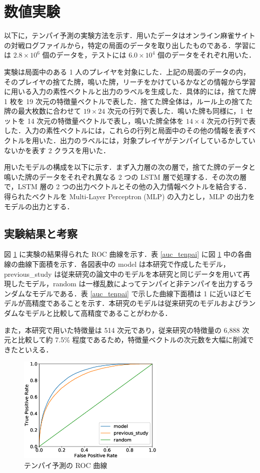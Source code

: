\documentclass[a4paper,twoside,twocolumn,10pt]{article}
\begin{document}
\section{数値実験}
以下に，テンパイ予測の実験方法を示す．用いたデータはオンライン麻雀サイトの対戦ログファイルから，特定の局面のデータを取り出したものである．学習には $2.8\times10^6$ 個のデータを，テストには $6.0\times10^4$ 個のデータをそれぞれ用いた．

実験は局面中のある 1 人のプレイヤを対象にした．上記の局面のデータの内，そのプレイヤの捨てた牌，鳴いた牌，リーチをかけているかなどの情報から学習に用いる入力の素性ベクトルと出力のラベルを生成した．具体的には，捨てた牌 1 枚を 19 次元の特徴量ベクトルで表した．捨てた牌全体は，ルール上の捨てた牌の最大枚数に合わせて $19\times24$ 次元の行列で表した．鳴いた牌も同様に，1 セットを 14 次元の特徴量ベクトルで表し，鳴いた牌全体を $14\times4$ 次元の行列で表した．入力の素性ベクトルには，これらの行列と局面中のその他の情報を表すベクトルを用いた．出力のラベルには，対象プレイヤがテンパイしているかしていないかを表す 2 クラスを用いた．

用いたモデルの構成を以下に示す．まず入力層の次の層で，捨てた牌のデータと鳴いた牌のデータをそれぞれ異なる 2 つの LSTM 層で処理する．その次の層で，LSTM 層の 2 つの出力ベクトルとその他の入力情報ベクトルを結合する．得られたベクトルを Multi-Layer Perceptron (MLP) の入力とし，MLP の出力をモデルの出力とする．

\subsection{実験結果と考察}
図 \ref{result_tenpai} に実験の結果得られた ROC 曲線を示す．表 \ref{auc_tenpai} に図 \ref{result_tenpai} 中の各曲線の曲線下面積を示す．各図表中の model は本研究で作成したモデル，previous\_study は従来研究の論文中のモデルを本研究と同じデータを用いて再現したモデル，random は一様乱数によってテンパイと非テンパイを出力するランダムなモデルである．表 \ref{auc_tenpai} で示した曲線下面積は 1 に近いほどモデルが高精度であることを示す．本研究のモデルは従来研究のモデルおよびランダムなモデルと比較して高精度であることがわかる．

また，本研究で用いた特徴量は 514 次元であり，従来研究の特徴量の 6,888 次元と比較して約 7.5\% 程度であるため，特徴量ベクトルの次元数を大幅に削減できたといえる．

\begin{figure}[tb]
  \centering
  \includegraphics[width=7cm]{ROC_gather_nontitle.eps}
  \caption{テンパイ予測の ROC 曲線}
  \label{result_tenpai}
\end{figure}
\end{document}
